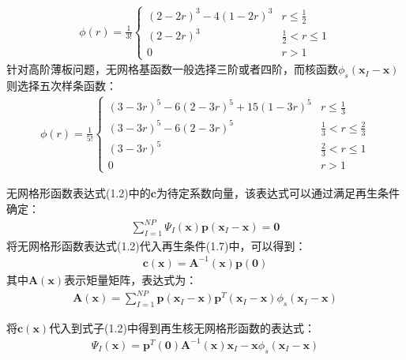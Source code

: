 \documentclass[a4paper]{ctexbook}
\begin{document}
\begin{equation}
\begin{split}
    \phi(r)=\frac{1}{3!}
\begin{cases}
    (2-2r)^3-4(1-2r)^3 &r\le \frac{1}{2}\\
    (2-2r)^3&\frac{1}{2}<r\le 1\\
    0&r>1
\end{cases}
\end{split}
\end{equation}
针对高阶薄板问题，无网格基函数一般选择三阶或者四阶，而核函数$\phi_s(\pmb{x}_I-\pmb{x})$则选择五次样条函数：
\begin{equation}
\begin{split}
    \phi(r)=\frac{1}{5!}
\begin{cases}
    (3-3r)^5-6(2-3r)^5+15(1-3r)^5&r\le\frac{1}{3}\\
    (3-3r)^5-6(2-3r)^5&\frac{1}{3}<r\le\frac{2}{3}\\
    (3-3r)^5&\frac{2}{3}<r\le1\\
    0&r>1
\end{cases}
\end{split}
\end{equation}\par
无网格形函数表达式(1.2)中的$\pmb{c}$为待定系数向量，该表达式可以通过满足再生条件确定：
\begin{equation}
\begin{split}
    \sum_{I=1}^{N\!P}\Psi_I(\pmb{x})\pmb{p}(\pmb{x}_I-\pmb{x})=\pmb{0}
\end{split}
\end{equation}
将无网格形函数表达式(1.2)代入再生条件(1.7)中，可以得到：
\begin{equation}
\begin{split}
    \pmb{c}(\pmb{x})=\pmb{A}^{-1}(\pmb{x})\pmb{p}(\pmb{0})
\end{split}
\end{equation}
其中$\pmb{A}(\pmb{x})$表示矩量矩阵，表达式为：
\begin{equation}
\begin{split}
    \pmb{A}(\pmb{x})=\sum_{I=1}^{N\!P}\pmb{p}(\pmb{x}_I-\pmb{x})\pmb{p}^T(\pmb{x}_I-\pmb{x})\phi_s(\pmb{x}_I-\pmb{x})
\end{split}
\end{equation}\par
将$\pmb{c}(\pmb{x})$代入到式子(1.2)中得到再生核无网格形函数的表达式：
\begin{equation}
\begin{split}
    \Psi_I(\pmb{x})=\pmb{p}^T(\pmb{0})\pmb{A}^{-1}(\pmb{x})\pmb{x}_I-\pmb{x}\phi_s(\pmb{x}_I-\pmb{x})
\end{split}
\end{equation}\par
\end{document}
